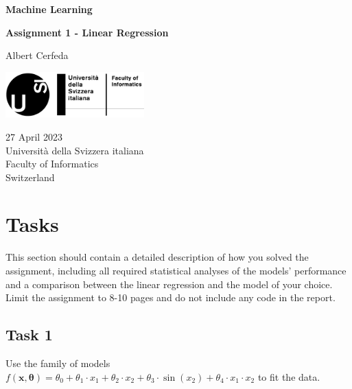 \documentclass[tikz,14pt,fleqn]{article}
\newcommand\namesurname{Albert Cerfeda}
\newcommand\assignment{Assignment 1 - Linear Regression}
\newcommand\subject{Machine Learning}
\newcommand\documentdate{27 April 2023}
\begin{document}
\begin{titlepage}
   \begin{center}
       \vspace*{0.2cm}

       \textbf{\Large{\subject}}

       \vspace{0.5cm}
        \textbf{\assignment}\\[5mm]
        
            
       \vspace{0.4cm}

        \namesurname
        \begin{figure}[H]
            \centering
        \end{figure}
       \tableofcontents

       \vspace*{\fill}
     
        \includegraphics[width=0.4\textwidth]{fig/logo.png}
       
        \documentdate \\
        Università della Svizzera italiana\\
        Faculty of Informatics\\
        Switzerland\\

   \end{center}
\end{titlepage}


\section{Tasks}

This section should contain a detailed description of how you solved the assignment, including all required statistical analyses of the models' performance and a comparison between the linear regression and the model of your choice. Limit the assignment to 8-10 pages and do not include any code in the report.

\subsection{Task 1}
Use the family of models $f(\mathbf{x}, \boldsymbol{\theta}) = \theta_0 + \theta_1 \cdot x_1 + \theta_2 \cdot x_2 + \theta_3 \cdot \sin(x_2) + \theta_4 \cdot x_1 \cdot x_2$ to fit the data. 
\end{document}
